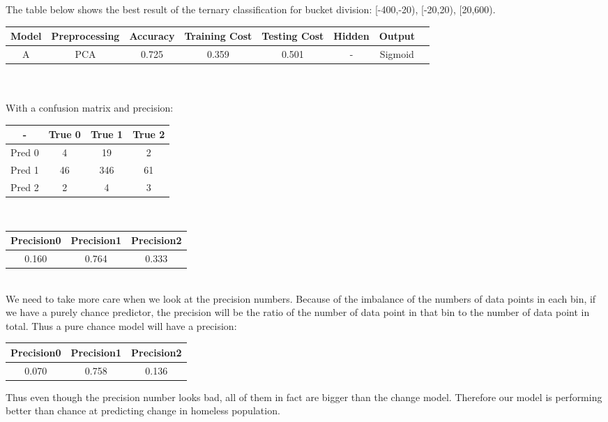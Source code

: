 \documentclass[11pt,letterpaper]{article}
\begin{document}
The table below shows the best result of the ternary classification for bucket division: [-400,-20), [-20,20), [20,600).\\

\begin{tabular}{c||ccccccc}
\hline 
Model & Preprocessing & Accuracy & Training Cost & Testing Cost & Hidden & Output \\ 
\hline 
A & PCA & 0.725 & 0.359 & 0.501 & - & Sigmoid \\ 
\hline 
\end{tabular} \\\\
With a confusion matrix and precision:\\
\begin{center}
\begin{tabular}{c|ccc}
- & True 0 & True 1 & True 2 \\ 
\hline 
Pred 0 & 4 & 19 & 2 \\ 
Pred 1 & 46 & 346 & 61 \\ 
Pred 2 & 2 & 4 & 3 \\ 
\end{tabular}
\end{center} 
\ \\
\begin{center}
\begin{tabular}{ccc}
\hline 
Precision0 & Precision1 & Precision2 \\ 
\hline 
0.160 &  0.764 & 0.333 \\ 
\hline 
\end{tabular}
\end{center}
\ \\

We need to take more care when we look at the precision numbers. Because of the imbalance of the numbers of data points in each bin, if we have a purely chance predictor, the precision will be the ratio of the number of data point in that bin to the number of data point in total. Thus a pure chance model will have a precision:\\
\begin{center}
\begin{tabular}{ccc}
\hline 
Precision0 & Precision1 & Precision2 \\ 
\hline 
0.070 &  0.758 & 0.136 \\ 
\hline 
\end{tabular}
\end{center}
Thus even though the precision number looks bad, all of them in fact are bigger than the change model. Therefore our model is performing better than chance at predicting change in homeless population. 
\end{document}
